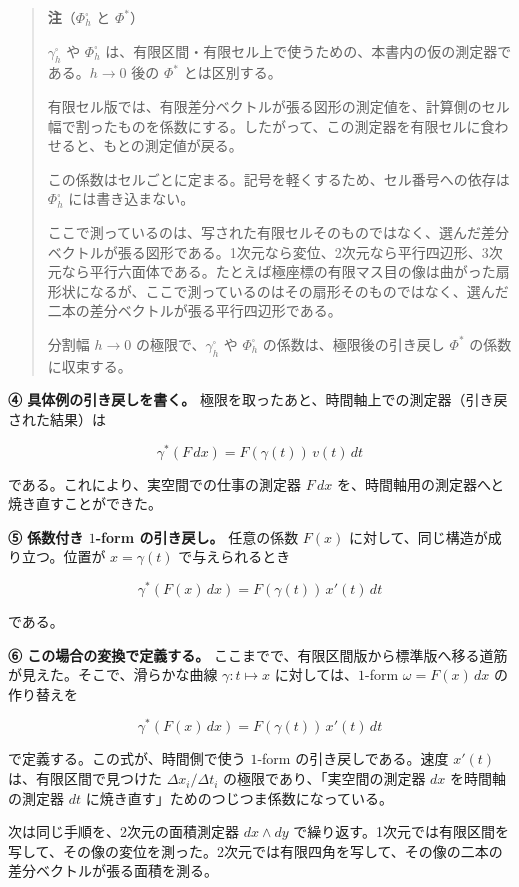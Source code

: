 \documentclass[a4paper,12pt,openany]{book}
\begin{document}
\begin{quote}
\textbf{注}（\(\Phi_h^\square\) と \(\Phi^*\)）

\(\gamma_h^\square\) や \(\Phi_h^\square\)
は、有限区間・有限セル上で使うための、本書内の仮の測定器である。\(h\to0\)
後の \(\Phi^*\) とは区別する。

有限セル版では、有限差分ベクトルが張る図形の測定値を、計算側のセル幅で割ったものを係数にする。したがって、この測定器を有限セルに食わせると、もとの測定値が戻る。

この係数はセルごとに定まる。記号を軽くするため、セル番号への依存は
\(\Phi_h^\square\) には書き込まない。

ここで測っているのは、写された有限セルそのものではなく、選んだ差分ベクトルが張る図形である。1次元なら変位、2次元なら平行四辺形、3次元なら平行六面体である。たとえば極座標の有限マス目の像は曲がった扇形状になるが、ここで測っているのはその扇形そのものではなく、選んだ二本の差分ベクトルが張る平行四辺形である。

分割幅 \(h\to0\) の極限で、\(\gamma_h^\square\) や \(\Phi_h^\square\)
の係数は、極限後の引き戻し \(\Phi^*\) の係数に収束する。
\end{quote}

\textbf{④ 具体例の引き戻しを書く。}
極限を取ったあと、時間軸上での測定器（引き戻された結果）は

\[\gamma^*(F\,dx) = F(\gamma(t))\,v(t)\,dt\]

である。これにより、実空間での仕事の測定器 \(F\,dx\)
を、時間軸用の測定器へと焼き直すことができた。

\textbf{⑤ 係数付き $1$-form の引き戻し。} 任意の係数 \(F(x)\)
に対して、同じ構造が成り立つ。位置が \(x = \gamma(t)\) で与えられるとき

\[
\gamma^*(F(x)\,dx)
=
F(\gamma(t))\,x'(t)\,dt
\]

である。

\textbf{⑥ この場合の変換で定義する。}
ここまでで、有限区間版から標準版へ移る道筋が見えた。そこで、滑らかな曲線
\(\gamma: t \mapsto x\) に対しては、\(1\)-form \(\omega = F(x)\,dx\)
の作り替えを

\[
\gamma^*(F(x)\,dx)
=
F(\gamma(t))\,x'(t)\,dt
\]

で定義する。この式が、時間側で使う \(1\)-form の引き戻しである。速度
\(x'(t)\) は、有限区間で見つけた \(\Delta x_i/\Delta t_i\)
の極限であり、「実空間の測定器 \(dx\) を時間軸の測定器 \(dt\)
に焼き直す」ためのつじつま係数になっている。

次は同じ手順を、2次元の面積測定器 \(dx\wedge dy\)
で繰り返す。1次元では有限区間を写して、その像の変位を測った。2次元では有限四角を写して、その像の二本の差分ベクトルが張る面積を測る。
\end{document}
